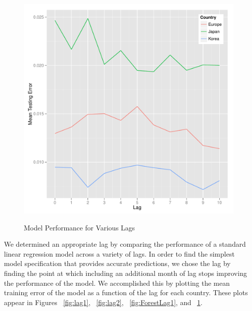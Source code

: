 \documentclass{sig-alternate-05-2015}
\begin{document}
\begin{figure}
\centering
\caption{Model Performance for Various Lags}
\includegraphics[scale=0.45]{ForestLag2.pdf}
\label{fig:ForestLag2}
\end{figure}

We determined an appropriate lag by comparing the performance of a standard linear regression model across a variety of lags. In order to find the simplest model specification that provides accurate predictions, we chose the lag by finding the point at which including an additional month of lag stops improving the performance of the model. We accomplished this by plotting the mean training error of the model as a function of the lag for each country. These plots appear in Figures ~\ref{fig:lag1}, ~\ref{fig:lag2}, ~\ref{fig:ForestLag1}, and ~\ref{fig:ForestLag2}. 
\end{document}
